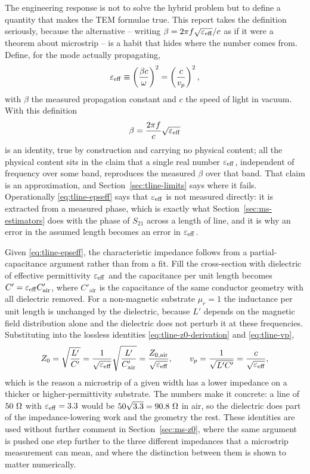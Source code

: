 The engineering response is not to solve the hybrid problem but to define a quantity that makes the TEM
formulae true. This report takes the definition seriously, because the alternative -- writing
$\beta=2\pi f\sqrt{\varepsilon_{\mathrm{eff}}}/c$ as if it were a theorem about microstrip -- is a habit that hides
where the number comes from. Define, for the mode actually propagating,
\begin{equation}
  \varepsilon_{\mathrm{eff}} \equiv \left(\frac{\beta c}{\omega}\right)^2 = \left(\frac{c}{v_p}\right)^2 ,
  \label{eq:tline-epseff}
\end{equation}
with $\beta$ the measured propagation constant and $c$ the speed of light in vacuum. With this definition
\begin{equation}
  \beta = \frac{2\pi f}{c}\sqrt{\varepsilon_{\mathrm{eff}}}
  \label{eq:tline-beta-epseff}
\end{equation}
is an identity, true by construction and carrying no physical content; all the physical content sits in the
claim that a single real number $\varepsilon_{\mathrm{eff}}$, independent of frequency over some band, reproduces the
measured $\beta$ over that band. That claim is an approximation, and Section~\ref{sec:tline-limits} says where it
fails. Operationally \eqref{eq:tline-epseff} says that $\varepsilon_{\mathrm{eff}}$ is not measured directly: it is
extracted from a measured phase, which is exactly what Section~\ref{sec:ms-estimators} does with the phase of
$S_{21}$ across a length of line, and it is why an error in the assumed length becomes an error in
$\varepsilon_{\mathrm{eff}}$.

Given \eqref{eq:tline-epseff}, the characteristic impedance follows from a partial-capacitance argument rather
than from a fit. Fill the cross-section with dielectric of effective permittivity $\varepsilon_{\mathrm{eff}}$ and the
capacitance per unit length becomes $C'=\varepsilon_{\mathrm{eff}}C'_{\mathrm{air}}$, where $C'_{\mathrm{air}}$ is the
capacitance of the same conductor geometry with all dielectric removed. For a non-magnetic substrate
$\mu_r=1$ the inductance per unit length is unchanged by the dielectric, because $L'$ depends on the magnetic
field distribution alone and the dielectric does not perturb it at these frequencies. Substituting into the
lossless identities \eqref{eq:tline-z0-derivation} and \eqref{eq:tline-vp},
\begin{equation}
  Z_0 = \sqrt{\frac{L'}{C'}} = \frac{1}{\sqrt{\varepsilon_{\mathrm{eff}}}}\sqrt{\frac{L'}{C'_{\mathrm{air}}}}
      = \frac{Z_{0,\mathrm{air}}}{\sqrt{\varepsilon_{\mathrm{eff}}}},
  \qquad v_p = \frac{1}{\sqrt{L'C'}} = \frac{c}{\sqrt{\varepsilon_{\mathrm{eff}}}} ,
  \label{eq:tline-z0-epseff}
\end{equation}
which is the reason a microstrip of a given width has a lower impedance on a thicker or higher-permittivity
substrate. The numbers make it concrete: a line of $50\ \Omega$ with $\varepsilon_{\mathrm{eff}}=3.3$ would be
$50\sqrt{3.3}=90.8\ \Omega$ in air, so the dielectric does part of the impedance-lowering work and the geometry the
rest. These identities are used without further comment in Section~\ref{sec:ms-z0}, where the same argument is
pushed one step further to the three different impedances that a microstrip measurement can mean, and where the
distinction between them is shown to matter numerically.

